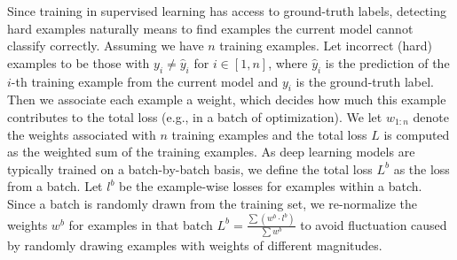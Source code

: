 \begin{algorithm}[!pt]
{    %
    }
\end{algorithm}

Since training in supervised learning has access to ground-truth labels, detecting hard examples naturally means to find examples the current model cannot classify correctly.
Assuming we have $n$ training examples.
Let incorrect (hard) examples to be those with $y_{i}\neq \hat{y}_{i}$ for $i \in [1, n]$, where $\hat{y}_{i}$ is the prediction of the $i$-th training example from the current model and $y_{i}$ is the ground-truth label.
Then we associate each example a weight, which decides how much this example contributes to the total loss (e.g., in a batch of optimization).
We let $w_{1:n}$ denote the weights associated with $n$ training examples and the total loss $L$ is computed as the weighted sum of the training examples. 
As deep learning models are typically trained on a batch-by-batch basis, we define the total loss $L^b$ as the loss from a batch.
Let $l^b$ be the example-wise losses for examples within a batch. 
Since a batch is randomly drawn from the training set, we re-normalize the weights $w^b$ for examples in that batch $L^b=\frac{\sum(w^b \cdot l^b)} {\sum w^b}$ to avoid fluctuation caused by randomly drawing examples with weights of different magnitudes.

